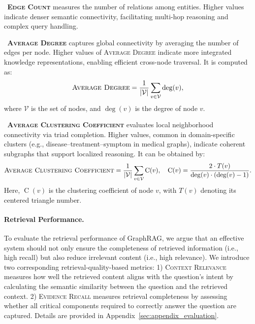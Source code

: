 \documentclass{article} %
\begin{document}
\noindent\textbullet\ \textbf{\textsc{Edge Count}} measures the number of relations among entities. Higher values indicate denser semantic connectivity, facilitating multi-hop reasoning and complex query handling.

\noindent\textbullet\ \textbf{\textsc{Average Degree}} captures global connectivity by averaging the number of edges per node. Higher values of \textsc{Average Degree} indicate more integrated knowledge representations, enabling efficient cross-node traversal. It is computed as:
\begin{equation}
\textsc{Average Degree} = \frac{1}{|\mathcal{V}|} \sum_{v \in \mathcal{V}} \deg(v),
\end{equation}
where $\mathcal{V}$ is the set of nodes, and $\deg(v)$ is the degree of node $v$.

\noindent\textbullet\ \textbf{\textsc{Average Clustering Coefficient}} evaluates local neighborhood connectivity via triad completion. Higher values, common in domain-specific clusters (e.g., disease–treatment–symptom in medical graphs), indicate coherent subgraphs that support localized reasoning. It can be obtained by:
\begin{equation}
\textsc{Average Clustering Coefficient} = \frac{1}{|\mathcal{V}|} \sum_{v \in \mathcal{V}} \operatorname{C}(v),\quad \operatorname{C}(v) = \frac{2 \cdot T(v)}{\deg(v) \cdot \left(\deg(v) - 1\right)}.
\end{equation}
Here, $\operatorname{C}(v)$ is the clustering coefficient of node $v$, with $T(v)$ denoting its centered triangle number.

\paragraph{Retrieval Performance.}
To evaluate the retrieval performance of GraphRAG, we argue that an effective system should not only ensure the completeness of retrieved information (i.e., high recall) but also reduce irrelevant content (i.e., high relevance). We introduce two corresponding retrieval-quality-based metrics: 1) \textsc{Context Relevance} measures how well the retrieved content aligns with the question’s intent by calculating the semantic similarity between the question and the retrieved context. 2) \textsc{Evidence Recall} measures retrieval completeness by assessing whether all critical components required to correctly answer the question are captured. Details are provided in Appendix~\ref{sec:appendix_evaluation}.
\end{document}
